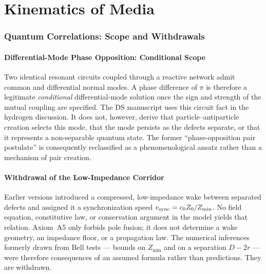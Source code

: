\documentclass[11pt,a4paper]{article}
\theoremstyle{plain}
\theoremstyle{remark}
\begin{document}
\part{Kinematics of Media}

\section{Quantum Correlations: Scope and Withdrawals}
\label{sec:nonlocal_correlations}

\subsection{Differential-Mode Phase Opposition: Conditional Scope}
Two identical resonant circuits coupled through a reactive network admit common and differential normal modes. A phase difference of $\pi$ is therefore a legitimate \emph{conditional} differential-mode solution once the sign and strength of the mutual coupling are specified. The DS manuscript uses this circuit fact in the hydrogen discussion. It does not, however, derive that particle--antiparticle creation selects this mode, that the mode persists as the defects separate, or that it represents a non-separable quantum state. The former ``phase-opposition pair postulate'' is consequently reclassified as a phenomenological ansatz rather than a mechanism of pair creation.

\subsection{Withdrawal of the Low-Impedance Corridor}
Earlier versions introduced a compressed, low-impedance wake between separated defects and assigned it a synchronization speed $v_{\rm sync}=c_0 Z_0/Z_{\min}$. No field equation, constitutive law, or conservation argument in the model yields that relation. Axiom~A5 only forbids pole fusion; it does not determine a wake geometry, an impedance floor, or a propagation law. The numerical inferences formerly drawn from Bell tests --- bounds on $Z_{\min}$ and on a separation $D-2r$ --- were therefore consequences of an assumed formula rather than predictions. They are withdrawn.
\end{document}
